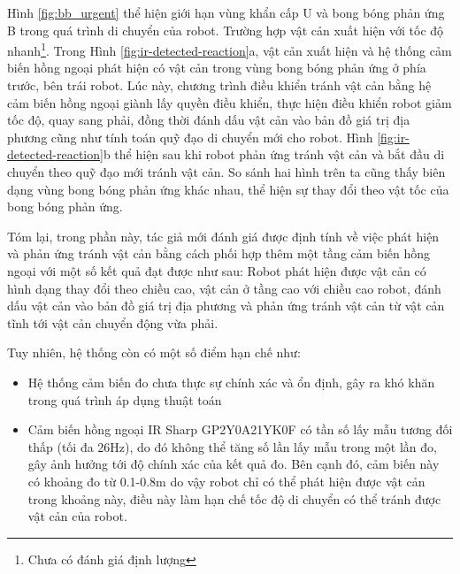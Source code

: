 Hình \ref{fig:bb_urgent} thể hiện giới hạn vùng khẩn cấp U và bong bóng phản ứng B trong quá trình di chuyển của robot. Trường hợp vật cản xuất hiện với tốc độ nhanh\footnote{Chưa có đánh giá định lượng}. Trong Hình \ref{fig:ir-detected-reaction}a, vật cản xuất hiện và hệ thống cảm biến hồng ngoại phát hiện có vật cản trong vùng bong bóng phản ứng ở phía trước, bên trái robot. Lúc này, chương trình điều khiển tránh vật cản bằng hệ cảm biến hồng ngoại giành lấy quyền điều khiển, thực hiện điều khiển robot giảm tốc độ, quay sang phải, đồng thời đánh dấu vật cản vào bản đồ giá trị địa phương cũng như tính toán quỹ đạo di chuyển mới cho robot. Hình \ref{fig:ir-detected-reaction}b thể hiện sau khi robot phản ứng tránh vật cản và bắt đầu di chuyển theo quỹ đạo mới tránh vật cản. So sánh hai hình trên ta cũng thấy biên dạng vùng bong bóng phản ứng khác nhau, thể hiện sự thay đổi theo vật tốc của bong bóng phản ứng.

Tóm lại, trong phần này, tác giả mới đánh giá được định tính về việc phát hiện và phản ứng tránh vật cản bằng cách phối hợp thêm một tầng cảm biến hồng ngoại với một số kết quả đạt được như sau:
Robot phát hiện được vật cản có hình dạng thay đổi theo chiều cao, vật cản ở tầng cao với chiều cao robot, đánh dấu vật cản vào bản đồ giá trị địa phương và phản ứng tránh vật cản từ vật cản tĩnh tới vật cản chuyển động vừa phải.

Tuy nhiên, hệ thống còn có một số điểm hạn chế như:
\begin{itemize}
    \item Hệ thống cảm biến đo chưa thực sự chính xác và ổn định, gây ra khó khăn trong quá trình áp dụng thuật toán
    \item Cảm biến hồng ngoại IR Sharp GP2Y0A21YK0F có tần số lấy mẫu tương đối thấp (tối đa 26Hz), do đó không thể tăng số lần lấy mẫu trong một lần đo, gây ảnh hưởng tới độ chính xác của kết quả đo. Bên cạnh đó, cảm biến này có khoảng đo từ 0.1-0.8m do vậy robot chỉ có thể phát hiện được vật cản trong khoảng này, điều này làm hạn chế tốc độ di chuyển có thể tránh được vật cản của robot.
\end{itemize}


